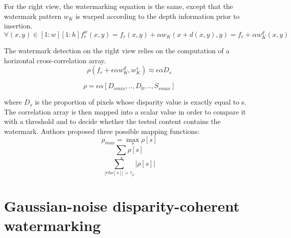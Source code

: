 For the right view, the watermarking equation is the same, except that the watermark pattern $w_{K}$ is warped according to the depth information prior to insertion.
\begin{equation}\label{eq:doerr3}
\forall(x,y) \in [1:w][1:h] f_{r}^{w}(x,y) = f_{r}(x,y)+\alpha w_{K}(x+d(x,y),y) = f_{r}+\alpha w_{K}^{d}(x,y)
\end{equation}


The watermark detection on the right view relies on the computation of a horizontal cross-correlation array.
\begin{equation}\label{eq:doerr4}
\rho (f_{r}+\epsilon\alpha w_{K}^{d},w_{K}^{s})\approx\epsilon\alpha D_{s}
\end{equation}

$$ \rho = \epsilon\alpha [D_{smin},..,D_{0},..,S_{smax}]$$


where $D_{s}$ is the proportion of pixels whose disparity value is exactly equal to s.\newline
The correlation array is then mapped into a scalar value in order to compare it with a threshold and to decide whether the tested content contains the watermark. Authors proposed three possible mapping functions:
\begin{equation}
\rho_{max}= \max_{s}\rho[s]
\end{equation}
\begin{equation}
 \sum_{s}\rho[s]
\end{equation}
\begin{equation}
\sum_{|rho[s]|>\tau_{\rho}}|\rho[s]|
\end{equation}

\section{Gaussian-noise disparity-coherent watermarking} 

